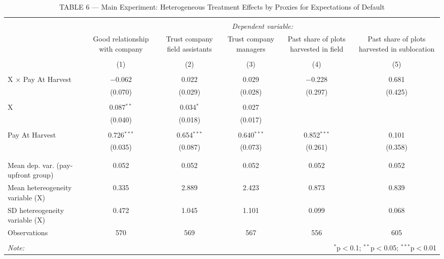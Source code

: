 
\begin{table}[!htbp] \centering 
  \caption{TABLE 6 — Main Experiment: Heterogeneous Treatment Effects by Proxies for Expectations of Default} 
  \label{} 
\begin{tabular}{@{\extracolsep{5pt}}lccccc} 
\\[-1.8ex]\hline 
\hline \\[-1.8ex] 
 & \multicolumn{5}{c}{\textit{Dependent variable:}} \\ 
\cline{2-6} 
 & Good relationship with company & Trust company field assistants & Trust company managers & Past share of plots harvested in field & Past share of plots harvested in sublocation \\ 
\\[-1.8ex] & (1) & (2) & (3) & (4) & (5)\\ 
\hline \\[-1.8ex] 
 X × Pay At Harvest & $-$0.062 & 0.022 & 0.029 & $-$0.228 & 0.681 \\ 
  & (0.070) & (0.029) & (0.028) & (0.297) & (0.425) \\ 
  & & & & & \\ 
 X & 0.087$^{**}$ & 0.034$^{*}$ & 0.027 &  &  \\ 
  & (0.040) & (0.018) & (0.017) &  &  \\ 
  & & & & & \\ 
 Pay At Harvest & 0.726$^{***}$ & 0.654$^{***}$ & 0.640$^{***}$ & 0.852$^{***}$ & 0.101 \\ 
  & (0.035) & (0.087) & (0.073) & (0.261) & (0.358) \\ 
  & & & & & \\ 
\hline \\[-1.8ex] 
Mean dep. var. (pay-upfront group) & 0.052 & 0.052 & 0.052 & 0.052 & 0.052 \\ 
Mean hetereogeneity variable (X) & 0.335 & 2.889 & 2.423 & 0.873 & 0.839 \\ 
SD hetereogeneity variable (X) & 0.472 & 1.045 & 1.101 & 0.099 & 0.068 \\ 
Observations & 570 & 569 & 567 & 556 & 605 \\ 
\hline 
\hline \\[-1.8ex] 
\textit{Note:}  & \multicolumn{5}{r}{$^{*}$p$<$0.1; $^{**}$p$<$0.05; $^{***}$p$<$0.01} \\ 
\end{tabular} 
\end{table} 
